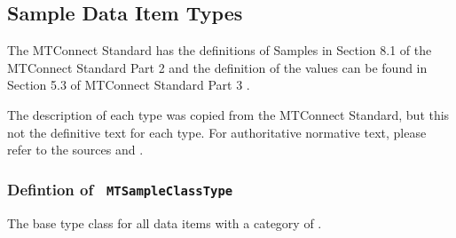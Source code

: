 \FloatBarrier
\subsection{Sample Data Item Types} \label{model:SampleDataItemTypes}

The MTConnect Standard has the definitions of \glspl{Sample} in 
Section 8.1 of the MTConnect Standard Part 2 \cite{MTCPart2} and the definition of the 
values can be found in Section 5.3 of MTConnect Standard Part 3 \cite{MTCPart3}. 

The description of each type was copied from the MTConnect Standard,
but this not the definitive text for each type. For authoritative normative text, 
please refer to the sources \cite{MTCPart2} and \cite{MTCPart3}.

\subsubsection{Defintion of \texttt{ MTSampleClassType}}
  \label{type:MTSampleClassType}

\FloatBarrier

The base type class for all data items with a \gls{category} of .

